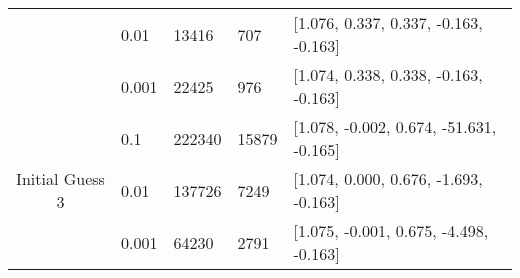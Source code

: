 \documentclass{article}
\begin{document}
\begin{table}[]
\begin{tabular}{@{}cllll@{}}
                                               & 0.01                                                                     & 13416                                                                       & 707                                                                         & {[}1.076, 0.337, 0.337, -0.163, -0.163{]}                                                                      \\
                                               & 0.001                                                                    & 22425                                                                       & 976                                                                         & {[}1.074, 0.338, 0.338, -0.163, -0.163{]}                                                                      \\
    \multirow{3}{*}{Initial Guess 3}           & 0.1                                                                      & 222340                                                                      & 15879                                                                       & {[}1.078, -0.002, 0.674, -51.631, -0.165{]}                                                                    \\
                                               & 0.01                                                                     & 137726                                                                      & 7249                                                                        & {[}1.074, 0.000, 0.676, -1.693, -0.163{]}                                                                      \\
                                               & 0.001                                                                    & 64230                                                                       & 2791                                                                        & {[}1.075, -0.001, 0.675, -4.498, -0.163{]}                                                                     \\ \cmidrule(l){2-5} 
    \end{tabular}
    \end{table}
\end{document}
